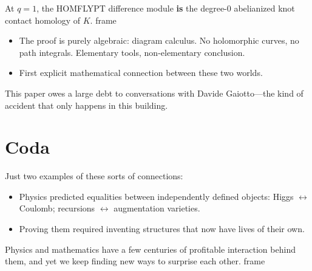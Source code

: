 \documentclass[presentation]{beamer}
\newenvironment{block}
\newenvironment{frame}
\theoremstyle{remark}
\begin{document}
\begin{frame}
  \begin{block}{Theorem (W.--Zaimi, 2026)}
    At $q=1$, the HOMFLYPT difference module {\bf is} the degree-0
    abelianized knot contact homology of $K$.
  \end{block}
  \begin{itemize}
  \item The proof is purely algebraic: diagram calculus.  No
    holomorphic curves, no path integrals.  Elementary tools,
    non-elementary conclusion.
  \item First explicit mathematical connection between these two worlds.
  \end{itemize}
  This paper owes a large debt to conversations with Davide
  Gaiotto---the kind of accident that only happens in this building.
\end{frame}

\section{Coda}
\begin{frame}
Just two examples of these sorts of connections:
  \begin{itemize}
  \item Physics predicted equalities between independently defined
    objects: Higgs $\leftrightarrow$ Coulomb; recursions
    $\leftrightarrow$ augmentation varieties.
  \item Proving them required inventing structures that now have lives of
    their own.
  \end{itemize}
\begin{block}{}
  Physics and mathematics have a few centuries of profitable interaction behind them, and yet we keep finding new ways to surprise each other.  
\end{block}
\end{frame}
\end{document}
